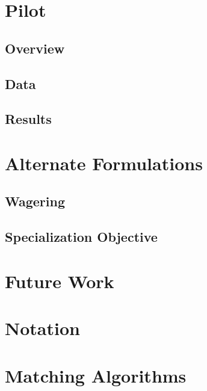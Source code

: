 \documentclass{article}
\begin{document}


\section{Pilot}

\subsection{Overview}



\subsection{Data}

\subsection{Results}

\section{Alternate Formulations}



\subsection{Wagering}

\subsection{Specialization Objective}

\section{Future Work}



\newpage

\appendix
\appendixpage
\addappheadtotoc

\section{Notation}



\section{Matching Algorithms}
\label{Matching}
\end{document}
